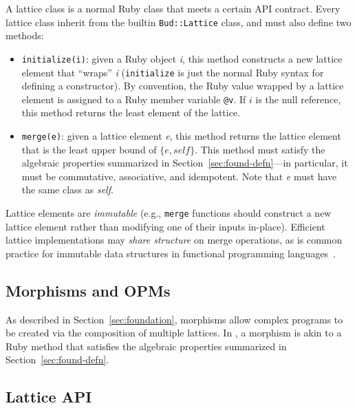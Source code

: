 A lattice class is a normal Ruby class that meets a certain API contract. Every
lattice class inherit from the builtin \texttt{Bud::Lattice} class, and
must also define two methods:
\begin{itemize}
\item \texttt{initialize(i)}: given a Ruby object \emph{i}, this method
  constructs a new lattice element that ``wraps'' \emph{i} (\texttt{initialize}
  is just the normal Ruby syntax for defining a constructor). By convention, the
  Ruby value wrapped by a lattice element is assigned to a Ruby member variable
  \texttt{@v}. If $i$ is the null reference, this method returns the least
  element of the lattice.

\item \texttt{merge(e)}: given a lattice element \emph{e}, this method returns the
  lattice element that is the least upper bound of $\{e, \textit{self}\}$. This method must
  satisfy the algebraic properties summarized in Section~\ref{sec:found-defn}---in
  particular, it must be commutative, associative, and idempotent. Note that
  \emph{e} must have the same class as \emph{self}.
\end{itemize}
Lattice elements are \emph{immutable} (e.g., \texttt{merge} functions should
construct a new lattice element rather than modifying one of their inputs
in-place). Efficient lattice implementations may \emph{share structure} on merge
operations, as is common practice for immutable data structures in functional
programming languages~\cite{Okasaki1999}. %

\subsection{Morphisms and OPMs}
\label{sec:lattice-funcs}
As described in Section~\ref{sec:foundation}, morphisms allow complex programs
to be created via the composition of multiple lattices. In \lang, a morphism is
akin to a Ruby method that satisfies the algebraic properties summarized in
Section~\ref{sec:found-defn}.

\subsection{Lattice API}
\label{sec:lattice-api}

